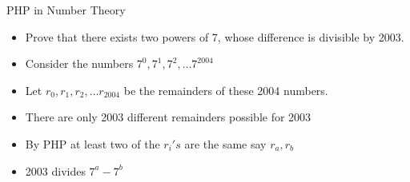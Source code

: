 \begin{frame}{PHP in Number Theory}
    \begin{itemize}[<+->]
        \item Prove that there exists two powers of 7, whose difference is divisible by 2003.
        \pause
        \item Consider the numbers $7^0, 7^1, 7^2, \dots 7^{2004}$
        \item Let $r_0, r_1, r_2, \dots r_{2004}$ be the remainders of these 2004 numbers.
        \item There are only 2003 different remainders possible for 2003
        \item By PHP at least two of the $r_i's$ are the same say $r_a, r_b$
        \item 2003 divides $7^a - 7^b$
    \end{itemize}
\end{frame}